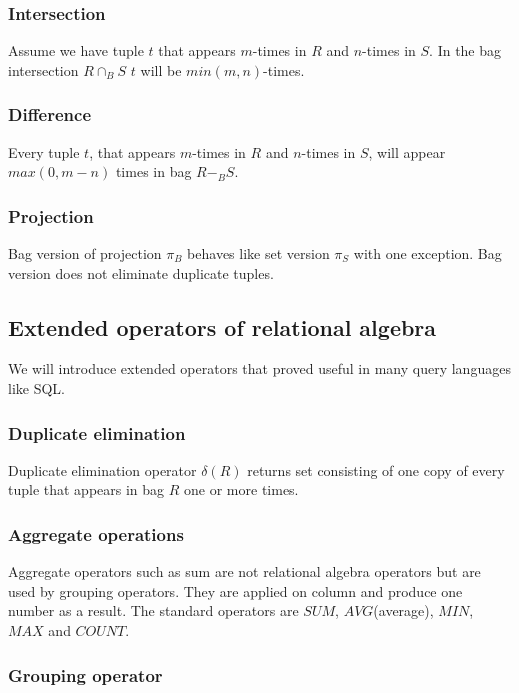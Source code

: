 \subsubsection{Intersection}

Assume we have tuple $t$ that appears $m$-times in $R$ and $n$-times in $S$. In the bag intersection $R \cap_B S$ $t$ will be $min(m,n)$-times.

\subsubsection{Difference}
Every tuple $t$, that appears $m$-times in $R$ and $n$-times in $S$, will appear $max(0,m-n)$ times in bag $R-_B S$.

\subsubsection{Projection}
Bag version of projection $\pi_B$ behaves like set version $\pi_S$ with one exception. Bag version does not eliminate duplicate tuples.

\subsection{Extended operators of relational algebra}

We will introduce extended operators that proved useful in many query languages like SQL.


\subsubsection{Duplicate elimination}
Duplicate elimination operator $\delta(R)$ returns set consisting of one copy of every tuple that appears in bag $R$ one or more times.

\subsubsection{Aggregate operations}

Aggregate operators such as sum are not relational algebra operators but are used by grouping operators. They are applied on column and produce one number as a result. The standard operators are $SUM$, $AVG$(average), $MIN$, $MAX$ and $COUNT$.


\subsubsection{Grouping operator}

